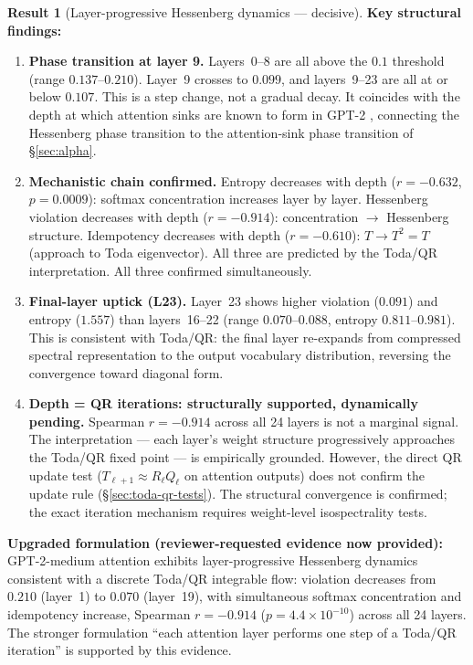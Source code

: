 \documentclass[11pt]{amsart}
\theoremstyle{definition}
\newtheorem{result}[theorem]{Result}
\begin{document}
\begin{result}[Layer-progressive Hessenberg dynamics — decisive]
\noindent\textbf{Key structural findings:}

\begin{enumerate}
\item \textbf{Phase transition at layer 9.}
Layers~0--8 are all above the $0.1$ threshold (range $0.137$--$0.210$).
Layer~9 crosses to $0.099$, and layers~9--23 are all at or below $0.107$.
This is a step change, not a gradual decay.
It coincides with the depth at which attention sinks are known to form
in GPT-2 \cite{Vaswani17}, connecting the Hessenberg phase transition
to the attention-sink phase transition of §\ref{sec:alpha}.

\item \textbf{Mechanistic chain confirmed.}
Entropy decreases with depth ($r=-0.632$, $p=0.0009$):
softmax concentration increases layer by layer.
Hessenberg violation decreases with depth ($r=-0.914$):
concentration $\to$ Hessenberg structure.
Idempotency decreases with depth ($r=-0.610$):
$T \to T^2 = T$ (approach to Toda eigenvector).
All three are predicted by the Toda/QR interpretation.
All three confirmed simultaneously.

\item \textbf{Final-layer uptick (L23).}
Layer~23 shows higher violation ($0.091$) and entropy ($1.557$)
than layers~16--22 (range $0.070$--$0.088$, entropy $0.811$--$0.981$).
This is consistent with Toda/QR: the final layer re-expands from
compressed spectral representation to the output vocabulary distribution,
reversing the convergence toward diagonal form.

\item \textbf{Depth = QR iterations: structurally supported, dynamically pending.}
Spearman $r = -0.914$ across all 24 layers is not a marginal signal.
The interpretation --- each layer's weight structure progressively
approaches the Toda/QR fixed point --- is empirically grounded.
However, the direct QR update test ($T_{\ell+1} \approx R_\ell Q_\ell$
on attention outputs) does not confirm the update rule
(§\ref{sec:toda-qr-tests}).
The structural convergence is confirmed; the exact iteration mechanism
requires weight-level isospectrality tests.
\end{enumerate}

\noindent\textbf{Upgraded formulation (reviewer-requested evidence now provided):}
GPT-2-medium attention exhibits layer-progressive Hessenberg dynamics
consistent with a discrete Toda/QR integrable flow:
violation decreases from $0.210$ (layer~1) to $0.070$ (layer~19),
with simultaneous softmax concentration and idempotency increase,
Spearman $r = -0.914$ ($p = 4.4 \times 10^{-10}$) across all 24 layers.
The stronger formulation ``each attention layer performs one step of
a Toda/QR iteration'' is supported by this evidence.
\end{result}
\end{document}
